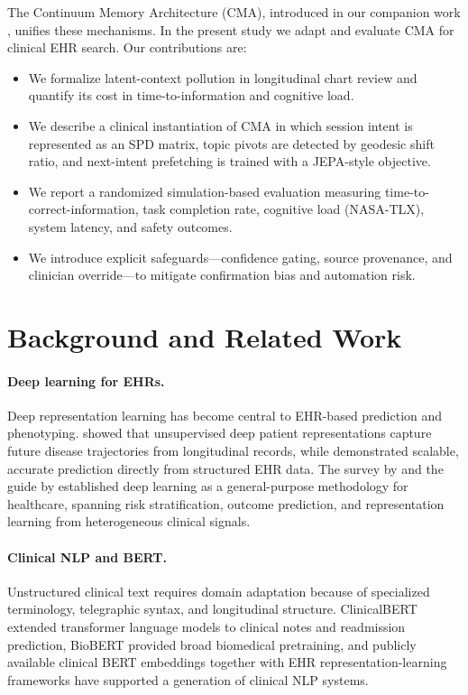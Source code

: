 \documentclass[preprint,12pt]{elsarticle}
\begin{document}
The Continuum Memory Architecture (CMA), introduced in our companion work \citep{cma2026}, unifies these mechanisms. In the present study we adapt and evaluate CMA for clinical EHR search. Our contributions are:
\begin{itemize}
  \item We formalize latent-context pollution in longitudinal chart review and quantify its cost in time-to-information and cognitive load.
  \item We describe a clinical instantiation of CMA in which session intent is represented as an SPD matrix, topic pivots are detected by geodesic shift ratio, and next-intent prefetching is trained with a JEPA-style objective.
  \item We report a randomized simulation-based evaluation measuring time-to-correct-information, task completion rate, cognitive load (NASA-TLX), system latency, and safety outcomes.
  \item We introduce explicit safeguards---confidence gating, source provenance, and clinician override---to mitigate confirmation bias and automation risk.
\end{itemize}

\section{Background and Related Work}

\paragraph{Deep learning for EHRs.} Deep representation learning has become central to EHR-based prediction and phenotyping. \citep{miotto2016} showed that unsupervised deep patient representations capture future disease trajectories from longitudinal records, while \citep{rajkomar2018} demonstrated scalable, accurate prediction directly from structured EHR data. The survey by \citep{shickel2017} and the guide by \citep{esteva19} established deep learning as a general-purpose methodology for healthcare, spanning risk stratification, outcome prediction, and representation learning from heterogeneous clinical signals.

\paragraph{Clinical NLP and BERT.} Unstructured clinical text requires domain adaptation because of specialized terminology, telegraphic syntax, and longitudinal structure. ClinicalBERT \citep{huang2019_clinicalbert} extended transformer language models to clinical notes and readmission prediction, BioBERT \citep{lee2020_biobert} provided broad biomedical pretraining, and publicly available clinical BERT embeddings \citep{alsentzer2019} together with EHR representation-learning frameworks \citep{weng19} have supported a generation of clinical NLP systems.
\end{document}
